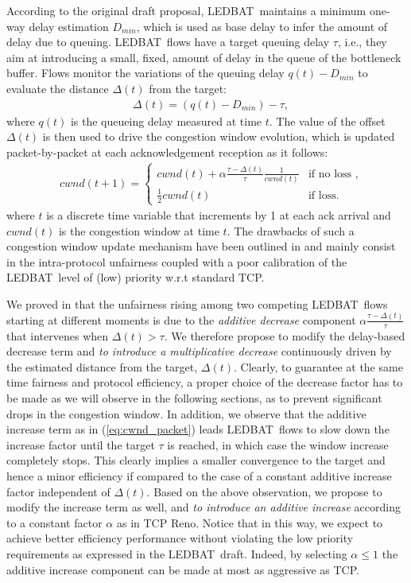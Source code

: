 \documentclass[conference]{IEEEtran}
\newcommand{\btledbat}[0]{LEDBAT}
\begin{document}
 According to the original draft proposal\cite{ledbat_draft}, \btledbat\  maintains a minimum one-way delay estimation $D_{min}$, which is used as base delay to infer the amount of delay due to queuing. \btledbat\ flows have a target queuing delay $\tau$, i.e., they aim at introducing a small, fixed, amount of delay in the queue of the bottleneck buffer. Flows monitor the variations of the queuing delay $q(t) - D_{min}$ to evaluate the distance $\Delta(t)$ from the target:
\begin{align}\label{eq:ledbat_delta}
   &	\Delta(t) = (q(t) - D_{min})-\tau,
\end{align}
where  $q(t)$ is the queueing delay measured at time $t$.
The value of the offset $\Delta(t)$ is then used to drive the congestion window evolution, which is updated packet-by-packet at each acknowledgement reception as it follows:
\begin{align}\label{eq:cwnd_packet}
   &cwnd(t+1)=
   \begin{cases}
      cwnd(t)+\alpha \frac{\tau - \Delta(t)}{\tau} \frac{1}{cwnd(t)}&\text{if no loss },\\
      \frac{1}{2}cwnd(t) &\text{if loss}.
   \end{cases}
\end{align}
where $t$ is a discrete time variable that increments by 1 at each ack arrival and $cwnd(t)$ is the congestion window at time $t$.
The drawbacks of such a congestion window update mechanism have been outlined in \cite{globecom10} and mainly 
consist in the intra-protocol unfairness coupled with a poor calibration of the \btledbat\ level of (low) priority 
w.r.t standard TCP.

We proved in \cite{globecom10} that the unfairness rising among two competing \btledbat\ flows starting at different moments is due to the
\emph{additive decrease} component $\alpha \frac{\tau - \Delta(t)}{\tau}$  that intervenes when $\Delta(t)>\tau$.
We therefore propose to modify the delay-based decrease term and \emph{to introduce a multiplicative decrease} continuously driven by the estimated distance from the target, $\Delta(t)$.
Clearly, to guarantee at the same time fairness and protocol efficiency, a proper choice of the decrease factor has to be made as we will observe in the following sections, as to prevent significant drops in the congestion window.
In addition, we observe that the additive increase term as in (\ref{eq:cwnd_packet}) leads \btledbat\ flows to slow down the increase factor until the target $\tau$ is reached, in which case the window increase completely stops.
This clearly implies a smaller convergence to the target and hence a minor efficiency if compared to the case of a constant additive increase factor  independent of $\Delta(t)$. Based on the above observation, we propose to modify the increase term as well, and \emph{to introduce an additive increase} according to a constant factor $\alpha$ as in TCP Reno.
Notice that in this way, we expect to achieve better efficiency performance without violating the low priority requirements as expressed in the \btledbat\ draft. Indeed, by selecting $\alpha\le 1$ the additive increase component can be made at most as aggressive as TCP.
\end{document}
